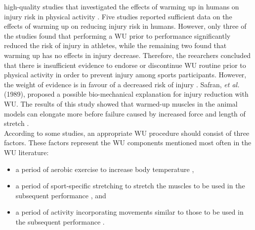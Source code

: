 high-quality studies that investigated the effects of warming up in humans on injury risk in physical activity \cite{fradkin2006does}. Five studies reported sufficient data on the effects of warming up on reducing injury risk in humans. However, only three of the studies found that performing a WU prior to performance significantly reduced the risk of injury in athletes, while the remaining two found that warming up has no effects in injury decrease\cite{fradkin2006does}. Therefore, the reearchers concluded that there is insufficient evidence to endorse or discontinue WU routine prior to physical activity in order to prevent injury among sports participants. However, the weight of evidence is in favour of a decreased risk of injury \cite{fradkin2006does}. Safran, \textit{et al.} (1989), proposed a possible bio-mechanical explanation for injury reduction with WU. The results of this study showed that warmed-up muscles in the animal models can elongate more before failure caused by increased force and length of stretch \cite{safran1989warm}.\\ According to some studies, an appropriate WU procedure should consist of three factors. These factors represent the WU components mentioned most often in the WU literature: 
\begin{itemize}
\item a period of aerobic exercise to increase body
temperature \cite{safran1989warm},
\item a period of sport-specific stretching to stretch 
the muscles to be used in the subsequent
performance \cite{safran1989warm}, and
\item a period of activity incorporating movements
similar to those to be used in the subsequent
performance \cite{safran1989warm}.
\end{itemize}
